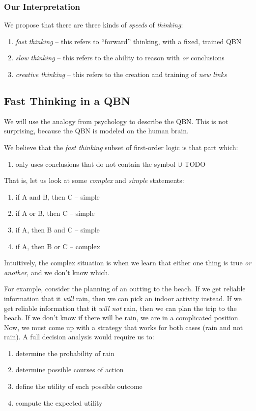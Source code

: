 \documentclass[12pt]{article}
\begin{document}
\subsubsection{Our Interpretation}
We propose that there are three kinds of {\em speeds} of {\em thinking}:
\begin{enumerate}
    \item {\em fast thinking} -- this refers to ``forward'' thinking, with a fixed, trained QBN
    \item {\em slow thinking} -- this refers to the ability to reason with {\em or} conclusions
    \item {\em creative thinking} -- this refers to the creation and training of {\em new links}
\end{enumerate}

\subsection{Fast Thinking in a QBN}
We will use the analogy from psychology to describe the QBN.
This is not surprising, because the QBN is modeled on the human brain.

We believe that the {\em fast thinking} subset of first-order logic is that part which:
\begin{enumerate}
    \item only uses conclusions that do not contain the symbol $\cup$ TODO
\end{enumerate}

That is, let us look at some {\em complex} and {\em simple} statements:
\begin{enumerate}
    \item if A and B, then C -- simple
    \item if A or B, then C -- simple
    \item if A, then B and C -- simple
    \item if A, then B or C -- complex
\end{enumerate}

Intuitively, the complex situation is when we learn that either one thing is true {\em or another}, and we don't know which.

For example, consider the planning of an outting to the beach.
If we get reliable information that it {\em will} rain, then we can pick an indoor activity instead.
If we get reliable information that it {\em will not} rain, then we can plan the trip to the beach.
If we don't know if there will be rain, we are in a complicated position.
Now, we must come up with a strategy that works for both cases (rain and not rain).
A full decision analysis would require us to:
\begin{enumerate}
    \item determine the probability of rain
    \item determine possible courses of action
    \item define the utility of each possible outcome
    \item compute the expected utility
\end{enumerate}
\end{document}

